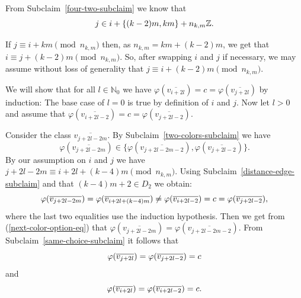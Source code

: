 \documentclass[a4paper,10pt,hidelinks]{amsart}
\newenvironment{claimproof}[1][\proofname]{\proof[#1]\renewcommand{\qedsymbol}{$\blacksquare$}}{\endproof}
\newenvironment{subclaimproof}[1][\proofname]{\proof[#1]\renewcommand{\qedsymbol}{$\blacklozenge$}}{\endproof}
\theoremstyle{definition}
\begin{document}
\begin{claimproof}[Proof of Claim~\ref{structure-claim} when $k \in \{6,8\}$]
\begin{subclaimproof}
            From Subclaim~\ref{four-two-subclaim} we know that 
            \begin{equation}\notag
                j \in i + \{(k-2)m, km\} + n_{k,m}\mathbb{Z}.
            \end{equation}

            If $j \equiv i + km \pmod{n_{k,m}}$ then, as $n_{k,m} = km + (k - 2)m$, we get that $i \equiv j + (k - 2)m \pmod{n_{k,m}}$. So, after swapping $i$ and $j$ if necessary, we may assume without loss of generality that $j \equiv i + (k-2)m \pmod{n_{k,m}}$.
            
            We will show that for all $l \in \mathbb{N}_0$ we have $\varphi(\overline{v_{i + 2l}}) = c = \varphi(\overline{v_{j + 2l}})$ by induction: The base case of $l=0$ is true by definition of $i$ and $j$. Now let $l > 0$ and assume that $\varphi(\overline{v_{i + 2l - 2}}) = c = \varphi(\overline{v_{j + 2l - 2}})$. 

            Consider the class $\overline{v_{j + 2l - 2m}}$. By Subclaim~\ref{two-colors-subclaim} we have 
            \begin{equation}\label{next-color-option-eq}
                \varphi(\overline{v_{j + 2l - 2m}}) \in \{\varphi(\overline{v_{j + 2l - 2m - 2}}), \varphi(\overline{v_{j + 2l - 2}})\}.
            \end{equation}
            By our assumption on $i$ and $j$ we have $j + 2l - 2m \equiv i + 2l + (k - 4)m \pmod{n_{k,m}}$. Using Subclaim~\ref{distance-edge-subclaim} and that $(k - 4)m + 2 \in D_2$ we obtain: 
            \begin{equation}\notag
                \varphi(\overline{v_{j + 2l - 2m}})=\varphi(\overline{v_{i + 2l + (k - 4)m}}) \neq \varphi(\overline{v_{i + 2l - 2}}) = c = \varphi(\overline{v_{j + 2l - 2}}),
            \end{equation}
                where the last two equalities use the induction hypothesis.
                Then we get from (\ref{next-color-option-eq}) that $\varphi(\overline{v_{j + 2l - 2m}}) = \varphi(\overline{v_{j + 2l - 2m - 2}})$. From Subclaim~\ref{same-choice-subclaim} it follows that 
            \begin{equation}\notag
                \varphi(\overline{v_{j + 2l}}) = \varphi(\overline{v_{j + 2l - 2}}) = c 
            \end{equation}
            and
            \begin{equation}\notag
                \varphi(\overline{v_{i + 2l}}) = \varphi(\overline{v_{i + 2l - 2}}) = c.
            \end{equation}


\end{subclaimproof}
\end{claimproof}
\end{document}
